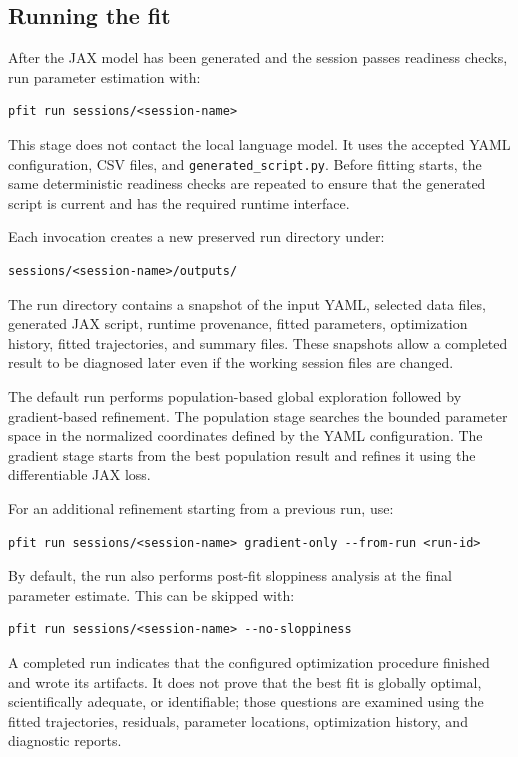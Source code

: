 \subsection{Running the fit}

After the JAX model has been generated and the session passes readiness checks,
run parameter estimation with:

\begin{verbatim}
pfit run sessions/<session-name>
\end{verbatim}

This stage does not contact the local language model. It uses the accepted YAML
configuration, CSV files, and \texttt{generated\_script.py}. Before fitting
starts, the same deterministic readiness checks are repeated to ensure that the
generated script is current and has the required runtime interface.

Each invocation creates a new preserved run directory under:

\begin{verbatim}
sessions/<session-name>/outputs/
\end{verbatim}

The run directory contains a snapshot of the input YAML, selected data files,
generated JAX script, runtime provenance, fitted parameters, optimization
history, fitted trajectories, and summary files. These snapshots allow a
completed result to be diagnosed later even if the working session files are
changed.

The default run performs population-based global exploration followed by
gradient-based refinement. The population stage searches the bounded parameter
space in the normalized coordinates defined by the YAML configuration. The
gradient stage starts from the best population result and refines it using the
differentiable JAX loss.

For an additional refinement starting from a previous run, use:

\begin{verbatim}
pfit run sessions/<session-name> gradient-only --from-run <run-id>
\end{verbatim}

By default, the run also performs post-fit sloppiness analysis at the final
parameter estimate. This can be skipped with:

\begin{verbatim}
pfit run sessions/<session-name> --no-sloppiness
\end{verbatim}

A completed run indicates that the configured optimization procedure finished
and wrote its artifacts. It does not prove that the best fit is globally
optimal, scientifically adequate, or identifiable; those questions are examined
using the fitted trajectories, residuals, parameter locations, optimization
history, and diagnostic reports.
